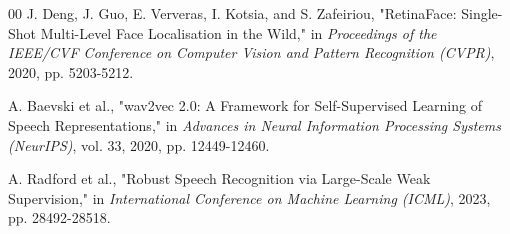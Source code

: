 \documentclass[conference]{IEEEtran}
\begin{document}
\begin{thebibliography}{00}
 J. Deng, J. Guo, E. Ververas, I. Kotsia, and S. Zafeiriou, "RetinaFace: Single-Shot Multi-Level Face Localisation in the Wild," in \textit{Proceedings of the IEEE/CVF Conference on Computer Vision and Pattern Recognition (CVPR)}, 2020, pp. 5203-5212.

 A. Baevski et al., "wav2vec 2.0: A Framework for Self-Supervised Learning of Speech Representations," in \textit{Advances in Neural Information Processing Systems (NeurIPS)}, vol. 33, 2020, pp. 12449-12460.

 A. Radford et al., "Robust Speech Recognition via Large-Scale Weak Supervision," in \textit{International Conference on Machine Learning (ICML)}, 2023, pp. 28492-28518.

\end{thebibliography}
\end{document}
